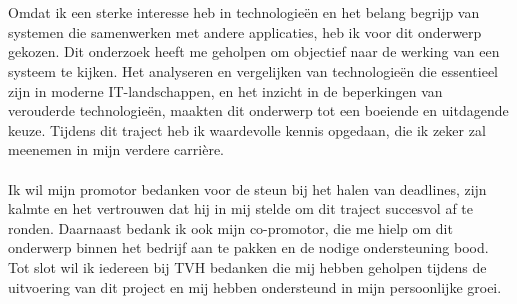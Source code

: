 
\chapter*{}%
\label{ch:voorwoord}



Omdat ik een sterke interesse heb in technologieën en het belang begrijp van systemen die samenwerken met andere applicaties,
heb ik voor dit onderwerp gekozen. 
Dit onderzoek heeft me geholpen om objectief naar de werking van een systeem te kijken.
Het analyseren en vergelijken van technologieën die essentieel zijn in moderne IT-landschappen, 
en het inzicht in de beperkingen van verouderde technologieën, 
maakten dit onderwerp tot een boeiende en uitdagende keuze. 
Tijdens dit traject heb ik waardevolle kennis opgedaan, die ik zeker zal meenemen in mijn verdere carrière.
\\\\
Ik wil mijn promotor bedanken voor de steun bij het halen van deadlines, 
zijn kalmte en het vertrouwen dat hij in mij stelde om dit traject succesvol af te ronden.
Daarnaast bedank ik ook mijn co-promotor, die me hielp om dit onderwerp binnen het bedrijf aan te pakken en 
de nodige ondersteuning bood. 
Tot slot wil ik iedereen bij TVH bedanken die mij hebben geholpen tijdens de uitvoering van dit project en
mij hebben ondersteund in mijn persoonlijke groei.